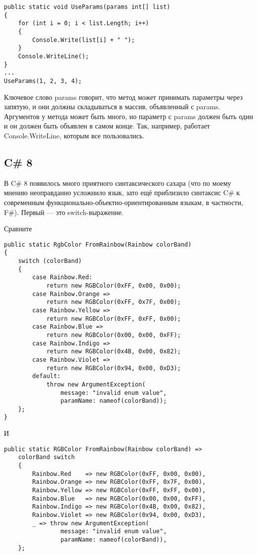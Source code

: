 \documentclass{../../text-style}
\begin{document}
\begin{verbatim}
public static void UseParams(params int[] list)
{
    for (int i = 0; i < list.Length; i++)
    {
        Console.Write(list[i] + " ");
    }
    Console.WriteLine();
}
...
UseParams(1, 2, 3, 4);
\end{verbatim}

Ключевое слово params говорит, что метод может принимать параметры через запятую, и они должны складываться в массив, объявленный с params. Аргументов у метода может быть много, но параметр с params должен быть один и он должен быть объявлен в самом конце. Так, например, работает Console.WriteLine, которым все пользовались.

\subsection{C\# 8}

В C\# 8 появилось много приятного синтаксического сахара (что по моему мнению неоправданно усложнило язык, зато ещё приблизило синтаксис C\# к современным функционально-объектно-ориентированным языкам, в частности, F\#). Первый --- это switch-выражение.

Сравните

\begin{verbatim}
public static RgbColor FromRainbow(Rainbow colorBand)
{ 
    switch (colorBand)
    {
        case Rainbow.Red: 
            return new RGBColor(0xFF, 0x00, 0x00);
        case Rainbow.Orange => 
            return new RGBColor(0xFF, 0x7F, 0x00);
        case Rainbow.Yellow => 
            return new RGBColor(0xFF, 0xFF, 0x00);
        case Rainbow.Blue => 
            return new RGBColor(0x00, 0x00, 0xFF);
        case Rainbow.Indigo => 
            return new RGBColor(0x4B, 0x00, 0x82);
        case Rainbow.Violet => 
            return new RGBColor(0x94, 0x00, 0xD3);
        default:
            throw new ArgumentException(
                message: "invalid enum value",
                paramName: nameof(colorBand));
    };
}
\end{verbatim}

И

\begin{verbatim}
public static RGBColor FromRainbow(Rainbow colorBand) =>
    colorBand switch
    {
        Rainbow.Red    => new RGBColor(0xFF, 0x00, 0x00),
        Rainbow.Orange => new RGBColor(0xFF, 0x7F, 0x00),
        Rainbow.Yellow => new RGBColor(0xFF, 0xFF, 0x00),
        Rainbow.Blue   => new RGBColor(0x00, 0x00, 0xFF),
        Rainbow.Indigo => new RGBColor(0x4B, 0x00, 0x82),
        Rainbow.Violet => new RGBColor(0x94, 0x00, 0xD3),
        _ => throw new ArgumentException(
                message: "invalid enum value", 
                paramName: nameof(colorBand)),
    };
\end{verbatim}
\end{document}

